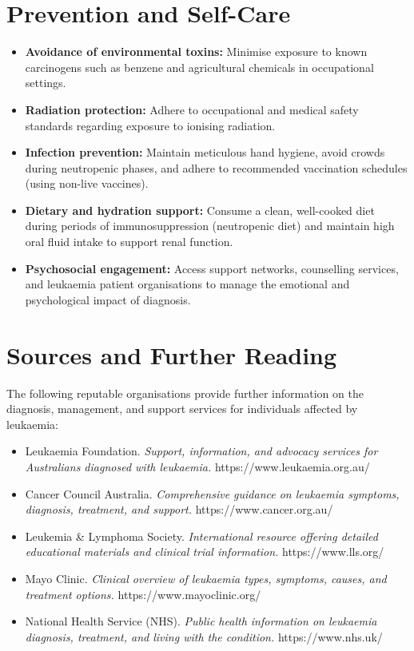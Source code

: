 \section*{Prevention and Self-Care}
\begin{itemize}
    \item \textbf{Avoidance of environmental toxins:} Minimise exposure to known carcinogens such as benzene and agricultural chemicals in occupational settings.
    \item \textbf{Radiation protection:} Adhere to occupational and medical safety standards regarding exposure to ionising radiation.
    \item \textbf{Infection prevention:} Maintain meticulous hand hygiene, avoid crowds during neutropenic phases, and adhere to recommended vaccination schedules (using non-live vaccines).
    \item \textbf{Dietary and hydration support:} Consume a clean, well-cooked diet during periods of immunosuppression (neutropenic diet) and maintain high oral fluid intake to support renal function.
    \item \textbf{Psychosocial engagement:} Access support networks, counselling services, and leukaemia patient organisations to manage the emotional and psychological impact of diagnosis.
\end{itemize}

\section*{Sources and Further Reading}
The following reputable organisations provide further information on the diagnosis, management, and support services for individuals affected by leukaemia:
\begin{itemize}
    \item Leukaemia Foundation. \textit{Support, information, and advocacy services for Australians diagnosed with leukaemia.} https://www.leukaemia.org.au/
    \item Cancer Council Australia. \textit{Comprehensive guidance on leukaemia symptoms, diagnosis, treatment, and support.} https://www.cancer.org.au/
    \item Leukemia \& Lymphoma Society. \textit{International resource offering detailed educational materials and clinical trial information.} https://www.lls.org/
    \item Mayo Clinic. \textit{Clinical overview of leukaemia types, symptoms, causes, and treatment options.} https://www.mayoclinic.org/
    \item National Health Service (NHS). \textit{Public health information on leukaemia diagnosis, treatment, and living with the condition.} https://www.nhs.uk/
\end{itemize}
